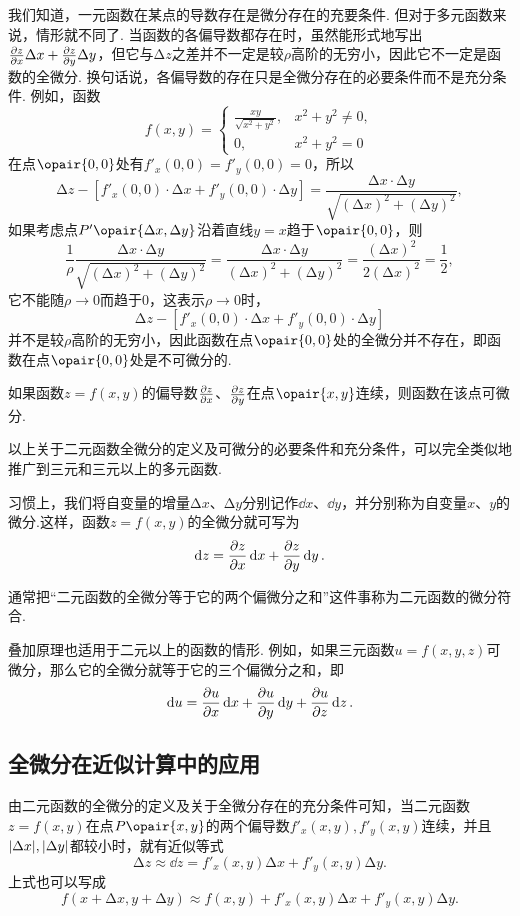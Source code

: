 我们知道，一元函数在某点的导数存在是微分存在的充要条件.
但对于多元函数来说，情形就不同了.
当函数的各偏导数都存在时，虽然能形式地写出\(\pdv{z}{x} \Delta x + \pdv{z}{y} \Delta y\)，但它与\(\increment z\)之差并不一定是较\(\rho\)高阶的无穷小，因此它不一定是函数的全微分.
换句话说，各偏导数的存在只是全微分存在的必要条件而不是充分条件.
例如，函数\[
f(x,y) = \left\{ \begin{array}{cl}
\frac{xy}{\sqrt{x^2+y^2}}, & x^2+y^2 \neq 0, \\
0, & x^2+y^2 = 0
\end{array} \right.
\]在点\(\opair{0,0}\)处有\(f'_x(0,0) = f'_y(0,0) = 0\)，所以\[
\increment z - [f'_x(0,0) \cdot \increment x + f'_y(0,0) \cdot \increment y]
= \frac{\increment x \cdot \increment y}{\sqrt{(\increment x)^2+(\increment y)^2}},
\]如果考虑点\(P'\opair{\increment x,\increment y}\)沿着直线\(y=x\)趋于\(\opair{0,0}\)，则\[
\frac{1}{\rho} \frac{\increment x \cdot \increment y}{\sqrt{(\increment x)^2+(\increment y)^2}}
= \frac{\increment x \cdot \increment y}{(\increment x)^2+(\increment y)^2}
= \frac{(\increment x)^2}{2(\increment x)^2}
= \frac{1}{2},
\]它不能随\(\rho\to0\)而趋于\(0\)，这表示\(\rho\to0\)时，\[
\increment z - [f'_x(0,0) \cdot \increment x + f'_y(0,0) \cdot \increment y]
\]并不是较\(\rho\)高阶的无穷小，因此函数在点\(\opair{0,0}\)处的全微分并不存在，即函数在点\(\opair{0,0}\)处是不可微分的.

\begin{theorem}[充分条件]\label{theorem:多元函数微分法.二元函数可微的充分条件}
如果函数\(z=f(x,y)\)的偏导数\(\pdv{z}{x}\)、\(\pdv{z}{y}\)在点\(\opair{x,y}\)连续，则函数在该点可微分.
\end{theorem}

以上关于二元函数全微分的定义及可微分的必要条件和充分条件，可以完全类似地推广到三元和三元以上的多元函数.

习惯上，我们将自变量的增量\(\increment x\)、\(\increment y\)分别记作\(\dd{x}\)、\(\dd{y}\)，并分别称为自变量\(x\)、\(y\)的微分.这样，函数\(z=f(x,y)\)的全微分就可写为\[
\dd{z}=\pdv{z}{x}\dd{x}+\pdv{z}{y}\dd{y}.
\]

通常把“二元函数的全微分等于它的两个偏微分之和”这件事称为二元函数的微分符合.

叠加原理也适用于二元以上的函数的情形.
例如，如果三元函数\(u = f(x,y,z)\)可微分，那么它的全微分就等于它的三个偏微分之和，即\[
\dd{u} = \pdv{u}{x} \dd{x} + \pdv{u}{y} \dd{y} + \pdv{u}{z} \dd{z}.
\]

\subsection{全微分在近似计算中的应用}
由二元函数的全微分的定义及关于全微分存在的充分条件可知，当二元函数\(z = f(x,y)\)在点\(P\opair{x,y}\)的两个偏导数\(f'_x(x,y),f'_y(x,y)\)连续，并且\(\abs{\Delta x},\abs{\Delta y}\)都较小时，就有近似等式\[
\increment z \approx \dd{z} = f'_x(x,y) \increment x + f'_y(x,y) \increment y.
\]上式也可以写成\[
f(x+\increment x,y+\increment y) \approx f(x,y) + f'_x(x,y) \increment x + f'_y(x,y) \increment y.
\]

